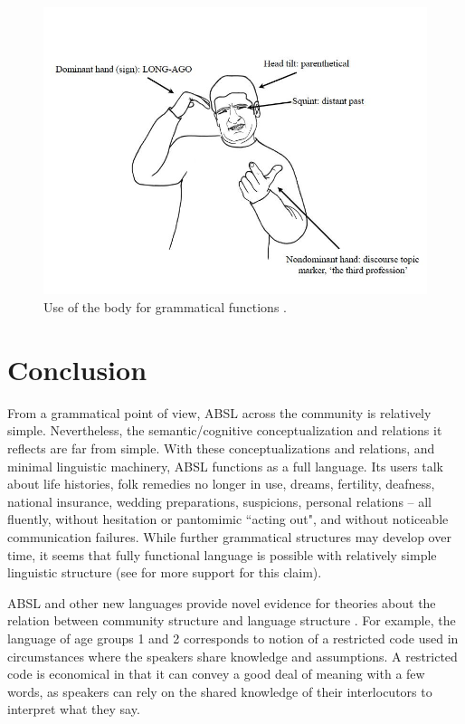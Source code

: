 \documentclass[output=paper]{langsci/langscibook}
\begin{document}
\begin{figure}
\includegraphics[width=\textwidth]{figures/6__use_of_body_ABSL.jpg}
\caption{Use of the body for grammatical functions \citep[from][]{Sandler2012a}.}
\label{fig:sandler:6}
\end{figure}



\section{Conclusion}

From a grammatical point of view, ABSL across the community is relatively simple. Nevertheless, the semantic/cognitive conceptualization and relations it reflects are far from simple.  With these conceptualizations and relations, and minimal linguistic machinery, ABSL functions as a full language.  Its users talk about life histories, folk remedies no longer in use, dreams, fertility, deafness, national insurance, wedding preparations, suspicions, personal relations – all fluently, without hesitation or pantomimic ``acting out", and without noticeable communication failures.  While further grammatical structures may develop over time, it seems that fully functional language is possible with relatively simple linguistic structure (see \citealt{Klein1997,Gil2005,Jackendoff2014} for more support for this claim).

ABSL and other new languages provide novel evidence for theories about the relation between community structure and language structure \citep{Meir2012}.  For example, the language of age groups 1 and 2 corresponds to  notion of a restricted code used in circumstances where the speakers share knowledge and assumptions.  A restricted code is economical in that it can convey a good deal of meaning with a few words, as speakers can rely on the shared knowledge of their interlocutors to interpret what they say.  
\end{document}

